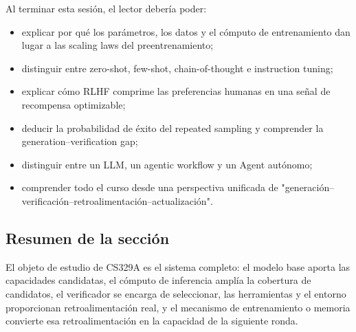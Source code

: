 Al terminar esta sesión, el lector debería poder:

\begin{itemize}
    \item explicar por qué los parámetros, los datos y el cómputo de entrenamiento dan lugar a las scaling laws del preentrenamiento;
    \item distinguir entre zero-shot, few-shot, chain-of-thought e instruction tuning;
    \item explicar cómo RLHF comprime las preferencias humanas en una señal de recompensa optimizable;
    \item deducir la probabilidad de éxito del repeated sampling y comprender la generation--verification gap;
    \item distinguir entre un LLM, un agentic workflow y un Agent autónomo;
    \item comprender todo el curso desde una perspectiva unificada de "generación--verificación--retroalimentación--actualización".
\end{itemize}

\subsection{Resumen de la sección}

El objeto de estudio de CS329A es el sistema completo: el modelo base aporta las capacidades candidatas, el cómputo de inferencia amplía la cobertura de candidatos, el verificador se encarga de seleccionar, las herramientas y el entorno proporcionan retroalimentación real, y el mecanismo de entrenamiento o memoria convierte esa retroalimentación en la capacidad de la siguiente ronda.

